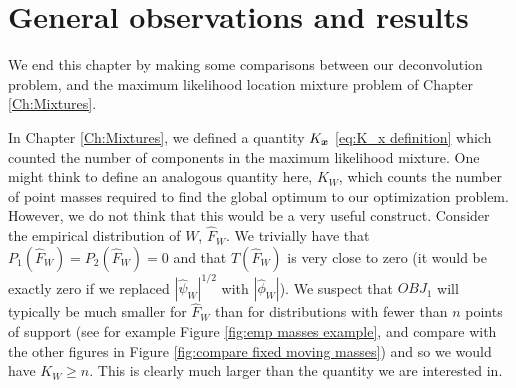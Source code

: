 
	

\section{General observations and results}
\label{sec:deconvolution observations and results}

We end this chapter by making some comparisons between our deconvolution problem, and the maximum likelihood location mixture problem of Chapter \ref{Ch:Mixtures}.

In Chapter \ref{Ch:Mixtures}, we defined a quantity $K_{\bm{{x}}}$ \eqref{eq:K_x definition} which counted the number of components in the maximum likelihood mixture. One might think to define an analogous quantity here, $K_W$, which counts the number of point masses required to find the global optimum to our optimization problem. However, we do not think that this would be a very useful construct. Consider the empirical distribution of $W$, $\hat{F}_W$. We trivially have that $P_1(\hat{F}_W) = P_2(\hat{F}_W) = 0$ and that $T(\hat{F}_W)$ is very close to zero (it would be exactly zero if we replaced $|\hat{\psi}_W|^{1/2}$ with $|\hat{\phi}_W|$). We suspect that $OBJ_1$ will typically be much smaller for $\hat{F}_W$ than for distributions with fewer than $n$ points of support (see for example Figure \ref{fig:emp masses example}, and compare with the other figures in Figure \ref{fig:compare fixed moving masses}) and so we would have $K_W \geq n$. This is clearly much larger than the quantity we are interested in.

